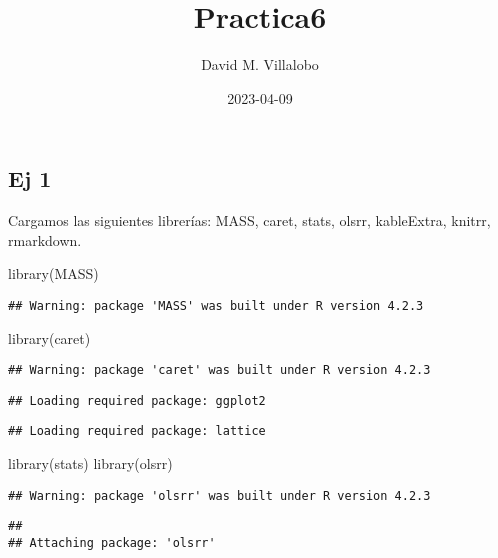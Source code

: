 \documentclass[
]{article}
\title{Practica6}
\author{David M. Villalobo}
\date{2023-04-09}
\newenvironment{Shaded}{\begin{snugshade}}{\end{snugshade}}
\newcommand{\FunctionTok}[1]{\textcolor[rgb]{0.00,0.00,0.00}{#1}}
\newcommand{\NormalTok}[1]{#1}
\begin{document}
\maketitle

\hypertarget{ej-1}{%
\subsection{Ej 1}\label{ej-1}}

Cargamos las siguientes librerías: MASS, caret, stats, olsrr,
kableExtra, knitrr, rmarkdown.

\begin{Shaded}
\begin{Highlighting}[]
\FunctionTok{library}\NormalTok{(MASS)}
\end{Highlighting}
\end{Shaded}

\begin{verbatim}
## Warning: package 'MASS' was built under R version 4.2.3
\end{verbatim}

\begin{Shaded}
\begin{Highlighting}[]
\FunctionTok{library}\NormalTok{(caret)}
\end{Highlighting}
\end{Shaded}

\begin{verbatim}
## Warning: package 'caret' was built under R version 4.2.3
\end{verbatim}

\begin{verbatim}
## Loading required package: ggplot2
\end{verbatim}

\begin{verbatim}
## Loading required package: lattice
\end{verbatim}

\begin{Shaded}
\begin{Highlighting}[]
\FunctionTok{library}\NormalTok{(stats)}
\FunctionTok{library}\NormalTok{(olsrr)}
\end{Highlighting}
\end{Shaded}

\begin{verbatim}
## Warning: package 'olsrr' was built under R version 4.2.3
\end{verbatim}

\begin{verbatim}
## 
## Attaching package: 'olsrr'
\end{verbatim}
\end{document}
